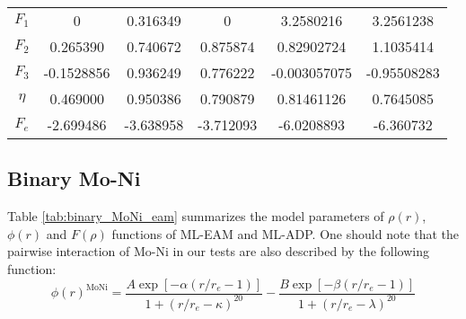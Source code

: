 \documentclass[prb,preprint]{revtex4-2}
\begin{document}
\begin{table}
{\begin{tabular}{cccccc}
$F_{1}$      & 0          & 0.316349   & 0          & 3.2580216   & 3.2561238   \\
$F_{2}$      & 0.265390   & 0.740672   & 0.875874   & 0.82902724   & 1.1035414   \\
$F_{3}$      & -0.1528856 & 0.936249   & 0.776222   & -0.003057075   & -0.95508283   \\
$\eta$       & 0.469000   & 0.950386   & 0.790879   & 0.81461126   & 0.7645085   \\
$F_{e}$      & -2.699486  & -3.638958  & -3.712093  & -6.0208893  & -6.360732  \\
\bottomrule
\end{tabular}
}
\label{tab:elementary_Ni_Mo_eam}
\end{table}

% 
%
\begin{table}
\caption{
Model parameters of the $\mu(r)$ and $\omega(r)$ functions of the elementary Mo 
ML-ADP.
}
\label{tab:elementary_Mo_adp}
\end{table}

% 
%
\subsection{Binary Mo-Ni}
\label{sec:binary}

Table \ref{tab:binary_MoNi_eam} summarizes the model parameters of $\rho(r)$, 
$\phi(r)$ and $F(\rho)$ functions of ML-EAM and ML-ADP. One should note that
the pairwise interaction of Mo-Ni in our tests are also described by the 
following function:
\begin{equation}
\phi(r)^{\mathrm{MoNi}} = 
\frac{A \exp\left[ -\alpha\left( r/r_{e} - 1 \right) \right]}
{1 + \left(r / r_{e} - \kappa\right)^{20}} - 
\frac{B \exp\left[ -\beta\left( r/r_{e} - 1 \right) \right]}
{1 + \left(r / r_{e} - \lambda\right)^{20}}
\end{equation}
\end{document}
